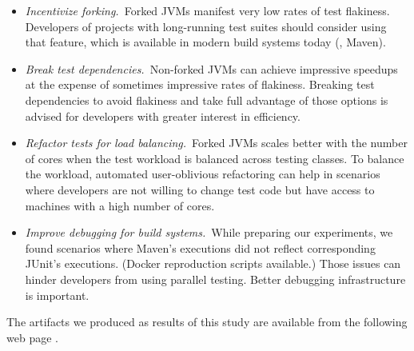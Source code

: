 \begin{itemize}
\item \emph{Incentivize forking.}~Forked JVMs manifest very low rates
  of test flakiness.  Developers of projects with long-running test
  suites should consider using that feature, which is available in
  modern build systems today (\eg{}, Maven).
\item \emph{Break test dependencies.}~Non-forked JVMs can achieve
  impressive speedups at the expense of sometimes impressive rates of
  flakiness.  Breaking test dependencies to avoid flakiness and take
  full advantage of those options is advised for developers with
  greater interest in efficiency.
\item \emph{Refactor tests for load balancing.}~Forked JVMs scales
  better with the number of cores when the test workload is balanced
  across testing classes.  To balance the workload, automated
  user-oblivious refactoring can help in scenarios where developers
  are not willing to change test code but have access to machines with
  a high number of cores.
\item \emph{Improve debugging for build systems.}~While preparing our
  experiments, we found scenarios where Maven's executions did not reflect
  corresponding JUnit's executions. (Docker reproduction scripts
  available.) Those issues can hinder developers from using parallel
  testing. Better debugging infrastructure is important.
\end{itemize}

The artifacts we produced as results of this study are available from
the following web page \webpage{}.


